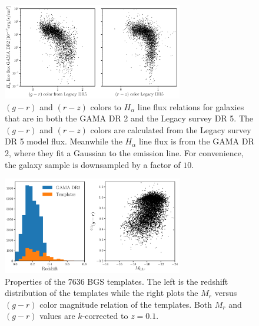 \documentclass[12pt, letterpaper, preprint]{aastex}
\begin{document}
\begin{figure}
\begin{center}
\includegraphics[width=0.7\textwidth]{figs/GAMALegacy_Halpha_color.pdf}
    \caption{$(g - r)$ and $(r - z)$ colors to $H_\alpha$ line flux 
    relations for galaxies that are in both the GAMA DR 2 and the 
    Legacy survey DR 5. The $(g - r)$ and $(r - z)$ colors are calculated
    from the Legacy survey DR 5 model flux. Meanwhile the $H_\alpha$ line 
    flux is from the GAMA DR 2, where they fit a Gaussian to the emission 
    line. For convenience, the galaxy sample is downsampled by a factor of 
    $10$.}
\label{fig:desigama_footprint}
\end{center}
\end{figure}

\begin{figure}
\begin{center}
\includegraphics[width=0.7\textwidth]{figs/BGStemplates.pdf}
    \caption{Properties of the $7636$ BGS templates. The left 
    is the redshift distribution of the templates while the right
    plots the $M_r$ versus $(g - r)$ color magnitude relation of 
    the templates. Both $M_r$ and $(g-r)$ values are $k$-corrected 
    to $z = 0.1$.}
\label{fig:bgstemp_meta}
\end{center}
\end{figure}
\end{document}
